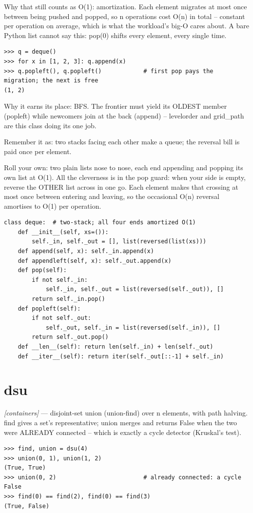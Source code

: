 \documentclass[11pt,letterpaper]{book}
\begin{document}
Why that still counts as O(1): amortization. Each element migrates at most once between being pushed and popped, so n operations cost O(n) in total -- constant per operation on average, which is what the workload's big-O cares about. A bare Python list cannot say this: pop(0) shifts every element, every single time.

\begin{lstlisting}[style=spec]
>>> q = deque()
>>> for x in [1, 2, 3]: q.append(x)
>>> q.popleft(), q.popleft()            # first pop pays the migration; the next is free
(1, 2)
\end{lstlisting}

Why it earns its place: BFS. The frontier must yield its OLDEST member (popleft) while newcomers join at the back (append) -- levelorder and grid\_path are this class doing its one job.


Remember it as: two stacks facing each other make a queue; the reversal bill is paid once per element.


Roll your own: two plain lists nose to nose, each end appending and popping its own list at O(1). All the cleverness is in the pop guard: when your side is empty, reverse the OTHER list across in one go. Each element makes that crossing at most once between entering and leaving, so the occasional O(n) reversal amortises to O(1) per operation.

\begin{lstlisting}[style=code]
class deque:  # two-stack; all four ends amortized O(1)
    def __init__(self, xs=()):
        self._in, self._out = [], list(reversed(list(xs)))
    def append(self, x): self._in.append(x)
    def appendleft(self, x): self._out.append(x)
    def pop(self):
        if not self._in:
            self._in, self._out = list(reversed(self._out)), []
        return self._in.pop()
    def popleft(self):
        if not self._out:
            self._out, self._in = list(reversed(self._in)), []
        return self._out.pop()
    def __len__(self): return len(self._in) + len(self._out)
    def __iter__(self): return iter(self._out[::-1] + self._in)
\end{lstlisting}

\section{dsu}
\noindent\textit{[containers]} --- disjoint-set union (union-find) over n elements, with path halving. find gives a set's representative; union merges and returns False when the two were ALREADY connected -- which is exactly a cycle detector (Kruskal's test).
\begin{lstlisting}[style=spec]
>>> find, union = dsu(4)
>>> union(0, 1), union(1, 2)
(True, True)
>>> union(0, 2)                         # already connected: a cycle
False
>>> find(0) == find(2), find(0) == find(3)
(True, False)
\end{lstlisting}
\end{document}
